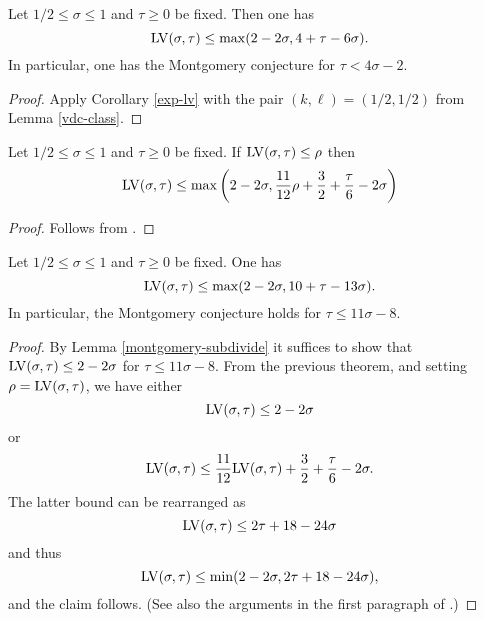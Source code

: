 \begin{theorem}\label{huxley-lv}\cite[Equation~(2.9)]{Huxley} Let $1/2 \leq \sigma \leq 1$ and $\tau \geq 0$ be fixed.  Then one has
    $$ \mathrm{LV}(\sigma,\tau) \leq \max( 2-2\sigma, 4 + \tau - 6 \sigma).$$
    In particular, one has the Montgomery conjecture for $\tau < 4 \sigma - 2$.
\end{theorem}

\begin{proof}  Apply Corollary \ref{exp-lv} with the pair $(k,\ell) = (1/2,1/2)$ from Lemma \ref{vdc-class}.
\end{proof}





\begin{theorem}\label{heath_brown-lv-prelim} Let $1/2 \leq \sigma \leq 1$ and $\tau \geq 0$ be fixed.  If $\mathrm{LV}(\sigma, \tau) \le \rho$ then
    \[
    \mathrm{LV}(\sigma, \tau) \le \max\left(2 - 2\sigma, \frac{11}{12}\rho + \frac{3}{2} + \frac{\tau}{6} - 2\sigma\right)
    \]
    \end{theorem}

    \begin{proof}
    Follows from \cite[Lemma~1]{heathbrown_zero_1979}.
    \end{proof}

\begin{theorem}\label{hb-opt} Let $1/2 \leq \sigma \leq 1$ and $\tau \geq 0$ be fixed.   One has
    $$ \mathrm{LV}(\sigma,\tau) \leq \max( 2-2\sigma, 10 + \tau - 13 \sigma).$$
In particular, the Montgomery conjecture holds for $\tau \leq 11 \sigma - 8$.
\end{theorem}

\begin{proof}  By Lemma \ref{montgomery-subdivide} it suffices to show that $\mathrm{LV}(\sigma,\tau) \leq 2-2\sigma$ for $\tau \leq 11\sigma-8$.  From the previous theorem, and setting $\rho = \mathrm{LV}(\sigma,\tau)$, we have either
$$ \mathrm{LV}(\sigma,\tau) \leq 2-2\sigma$$
or
$$ \mathrm{LV}(\sigma,\tau) \leq \frac{11}{12}\mathrm{LV}(\sigma,\tau) + \frac{3}{2} + \frac{\tau}{6} - 2\sigma.$$
The latter bound can be rearranged as
$$ \mathrm{LV}(\sigma,\tau) \leq 2\tau + 18 - 24\sigma$$
and thus
$$ \mathrm{LV}(\sigma,\tau) \leq \min( 2-2\sigma, 2\tau + 18 - 24\sigma),$$
and the claim follows.  (See also the arguments in the first paragraph of \cite[p. 226]{heathbrown_zero_1979}.)
\end{proof}


